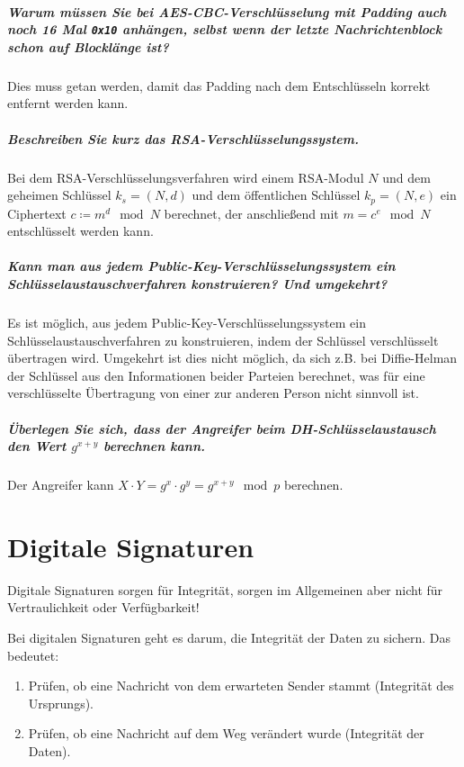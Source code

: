         \paragraph{Warum müssen Sie bei AES-CBC-Verschlüsselung mit Padding auch noch 16 Mal \texttt{0x10} anhängen, selbst wenn der letzte Nachrichtenblock schon auf Blocklänge ist?}
        Dies muss getan werden, damit das Padding nach dem Entschlüsseln korrekt entfernt werden kann.
        
        \paragraph{Beschreiben Sie kurz das RSA-Verschlüsselungssystem.}
        Bei dem RSA-Verschlüsselungsverfahren wird einem RSA-Modul \(N\) und dem geheimen Schlüssel \(k_s = (N, d)\) und dem öffentlichen Schlüssel \(k_p = (N, e)\) ein Ciphertext \( c \coloneqq m^d \mod N \) berechnet, der anschließend mit \( m = c^e \mod N \) entschlüsselt werden kann.
        
        \paragraph{Kann man aus jedem Public-Key-Verschlüsselungssystem ein Schlüsselaustauschverfahren konstruieren? Und umgekehrt?}
        Es ist möglich, aus jedem Public-Key-Verschlüsselungssystem ein Schlüsselaustauschverfahren zu konstruieren, indem der Schlüssel verschlüsselt übertragen wird. Umgekehrt ist dies nicht möglich, da sich z.B. bei Diffie-Helman der Schlüssel aus den Informationen beider Parteien berechnet, was für eine verschlüsselte Übertragung von einer zur anderen Person nicht sinnvoll ist.
        
        \paragraph{Überlegen Sie sich, dass der Angreifer beim DH-Schlüsselaustausch den Wert \(g^{x + y}\) berechnen kann.}
        Der Angreifer kann \( X \cdot Y = g ^ x \cdot g ^ y = g ^ {x+y} \mod p \) berechnen.

\chapter{Digitale Signaturen}
    Digitale Signaturen sorgen für Integrität, sorgen im Allgemeinen aber nicht für Vertraulichkeit oder Verfügbarkeit!
    
    Bei digitalen Signaturen geht es darum, die Integrität der Daten zu sichern. Das bedeutet:
    \begin{enumerate}
    	\item Prüfen, ob eine Nachricht von dem erwarteten Sender stammt (Integrität des Ursprungs).
    	\item Prüfen, ob eine Nachricht auf dem Weg verändert wurde (Integrität der Daten).
    \end{enumerate}

